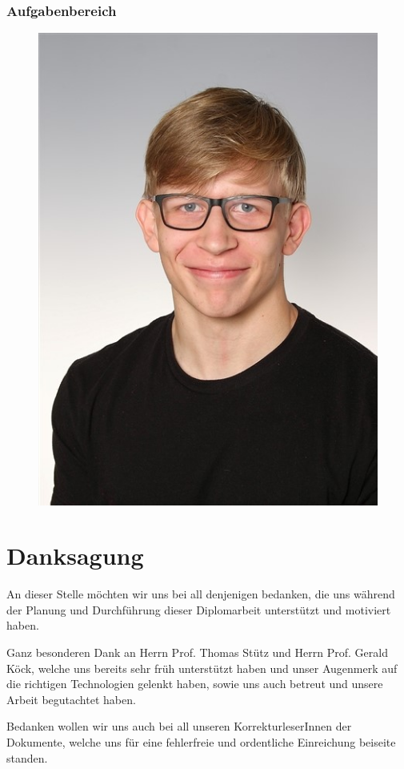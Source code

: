 \subsubsection{Aufgabenbereich}
\begin{figure}[H]
	\includegraphics[scale=1]{images/stefan_waldl.jpg}
\end{figure}
\pagebreak
 

\section*{Danksagung}

An dieser Stelle möchten wir uns bei all denjenigen bedanken, die uns während der
Planung und Durchführung dieser Diplomarbeit unterstützt und motiviert haben.

Ganz besonderen Dank an Herrn Prof. Thomas Stütz und Herrn Prof. Gerald Köck, welche uns bereits sehr früh unterstützt haben und unser Augenmerk auf die richtigen Technologien gelenkt haben, sowie uns auch betreut und unsere Arbeit begutachtet haben.

Bedanken wollen wir uns auch bei all unseren KorrekturleserInnen der Dokumente, welche
uns für eine fehlerfreie und ordentliche Einreichung beiseite standen.